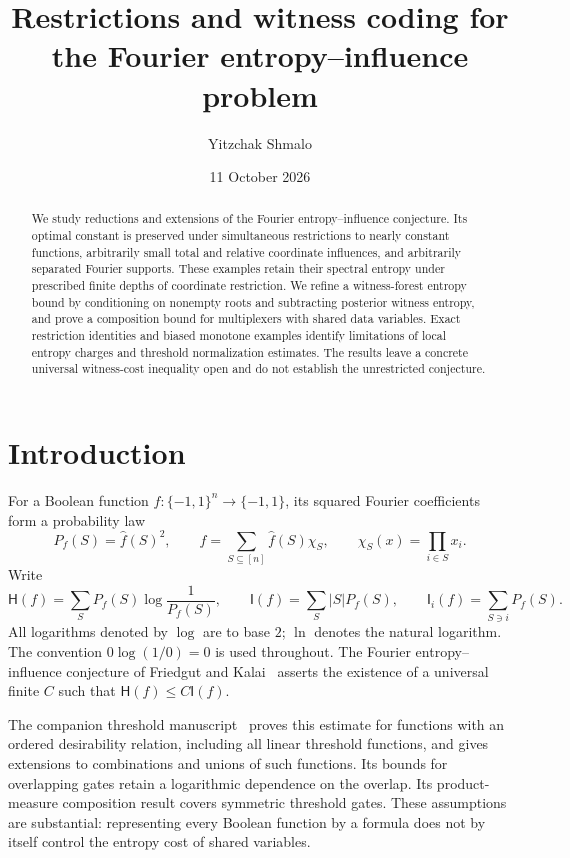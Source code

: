 \documentclass[11pt]{amsart}
\title[Restrictions and witness coding for FEI]{Restrictions and witness coding for the Fourier entropy--influence problem}
\author{Yitzchak Shmalo}
\date{11 October 2026}
\theoremstyle{definition}
\theoremstyle{remark}
\newcommand{\bits}{\{-1,1\}}
\newcommand{\HH}{\mathsf H}
\newcommand{\I}{\mathsf I}
\newcommand{\wh}[1]{\widehat{#1}}
\begin{document}
\begin{abstract}
We study reductions and extensions of the Fourier entropy--influence conjecture. Its optimal constant is preserved under simultaneous restrictions to nearly constant functions, arbitrarily small total and relative coordinate influences, and arbitrarily separated Fourier supports. These examples retain their spectral entropy under prescribed finite depths of coordinate restriction. We refine a witness-forest entropy bound by conditioning on nonempty roots and subtracting posterior witness entropy, and prove a composition bound for multiplexers with shared data variables. Exact restriction identities and biased monotone examples identify limitations of local entropy charges and threshold normalization estimates. The results leave a concrete universal witness-cost inequality open and do not establish the unrestricted conjecture.
\end{abstract}
\maketitle

\section{Introduction}

For a Boolean function $f:\bits^n\to\bits$, its squared Fourier coefficients form a probability law
\[
 P_f(S)=\wh f(S)^2,\qquad
 f=\sum_{S\subseteq[n]}\wh f(S)\chi_S,
 \qquad \chi_S(x)=\prod_{i\in S}x_i.
\]
Write
\begin{equation}\label{eq:HI}
 \HH(f)=\sum_S P_f(S)\log\frac1{P_f(S)},\qquad
 \I(f)=\sum_S |S|P_f(S),\qquad
 \I_i(f)=\sum_{S\ni i}P_f(S).
\end{equation}
All logarithms denoted by $\log$ are to base $2$; $\ln$ denotes the natural logarithm. The convention $0\log(1/0)=0$ is used throughout. The Fourier entropy--influence conjecture of Friedgut and Kalai~\cite{FK96} asserts the existence of a universal finite $C$ such that $\HH(f)\le C\I(f)$.

The companion threshold manuscript~\cite{Threshold} proves this estimate for functions with an ordered desirability relation, including all linear threshold functions, and gives extensions to combinations and unions of such functions. Its bounds for overlapping gates retain a logarithmic dependence on the overlap. Its product-measure composition result covers symmetric threshold gates. These assumptions are substantial: representing every Boolean function by a formula does not by itself control the entropy cost of shared variables.
\end{document}
